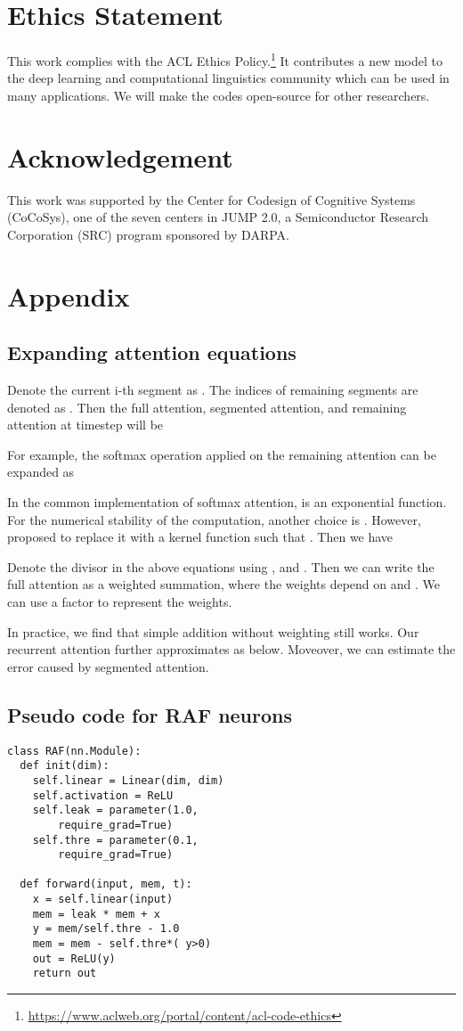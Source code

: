 \documentclass[11pt]{article}
\begin{document}
\section*{Ethics Statement}
This work complies with the ACL Ethics Policy.\footnote{\url{https://www.aclweb.org/portal/content/acl-code-ethics}} It contributes a new model to the deep learning and computational linguistics community which can be used in many applications. We will make the codes open-source for other researchers.


\section*{Acknowledgement}
This work was supported by the Center for Codesign of Cognitive Systems (CoCoSys), one of the seven centers in JUMP 2.0, a Semiconductor Research Corporation (SRC) program sponsored by DARPA.




\newpage
\appendix
\section{Appendix}
\subsection{Expanding attention equations}
\label{sec:appendix}
Denote the current i-th segment as . The indices of remaining segments are denoted as . Then the full attention, segmented attention, and remaining attention at timestep  will be
 
For example, the softmax operation applied on the remaining attention  can be expanded as
 
In the common implementation of softmax attention,  is an exponential function. For the numerical stability of the computation, another choice is  \cite{softmax}. However, \citet{transformerRNN} proposed to replace it with a kernel function such that . Then we have 

Denote the divisor in the above equations using , and . 
Then we can write the full attention as a weighted summation, where the weights depend on  and . We can use a factor  to represent the weights.

In practice, we find that simple addition without weighting still works. Our recurrent attention further approximates  as below. 
Moveover, we can estimate the error caused by segmented attention.
 
\subsection{Pseudo code for RAF neurons}
\label{RAFappendix}
\begin{lstlisting}
class RAF(nn.Module):
  def init(dim):
    self.linear = Linear(dim, dim)
    self.activation = ReLU
    self.leak = parameter(1.0,
        require_grad=True)
    self.thre = parameter(0.1,
        require_grad=True)
    
  def forward(input, mem, t):
    x = self.linear(input)
    mem = leak * mem + x
    y = mem/self.thre - 1.0 
    mem = mem - self.thre*( y>0)
    out = ReLU(y)
    return out
\end{lstlisting}
\end{document}

